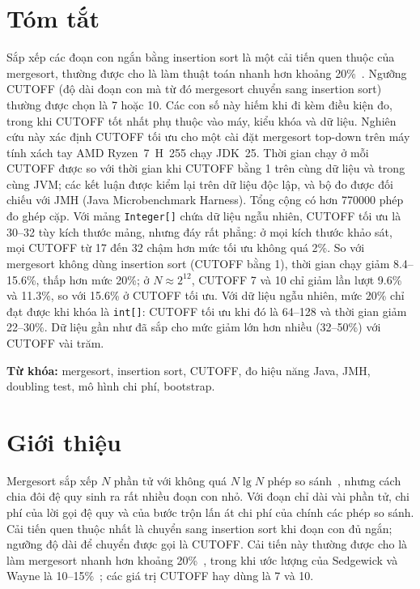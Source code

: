 \documentclass[12pt,a4paper]{article}
\begin{document}
\section*{Tóm tắt}\label{sec:abs}
Sắp xếp các đoạn con ngắn bằng insertion sort là một cải tiến quen thuộc của mergesort, thường được cho là làm thuật toán nhanh hơn khoảng 20\%~\citep{baigiang}. Ngưỡng CUTOFF (độ dài đoạn con mà từ đó mergesort chuyển sang insertion sort) thường được chọn là 7 hoặc 10. Các con số này hiếm khi đi kèm điều kiện đo, trong khi CUTOFF tốt nhất phụ thuộc vào máy, kiểu khóa và dữ liệu. Nghiên cứu này xác định CUTOFF tối ưu cho một cài đặt mergesort top-down trên máy tính xách tay AMD Ryzen~7~H~255 chạy JDK~25. Thời gian chạy ở mỗi CUTOFF được so với thời gian khi CUTOFF bằng 1 trên cùng dữ liệu và trong cùng JVM; các kết luận được kiểm lại trên dữ liệu độc lập, và bộ đo được đối chiếu với JMH (Java Microbenchmark Harness). Tổng cộng có hơn \num{770000} phép đo ghép cặp. Với mảng \texttt{Integer[]} chứa dữ liệu ngẫu nhiên, CUTOFF tối ưu là 30--32 tùy kích thước mảng, nhưng đáy rất phẳng: ở mọi kích thước khảo sát, mọi CUTOFF từ 17 đến 32 chậm hơn mức tối ưu không quá 2\%. So với mergesort không dùng insertion sort (CUTOFF bằng 1), thời gian chạy giảm 8.4--15.6\%, thấp hơn mức 20\%; ở $N \approx 2^{12}$, CUTOFF 7 và 10 chỉ giảm lần lượt 9.6\% và 11.3\%, so với 15.6\% ở CUTOFF tối ưu. Với dữ liệu ngẫu nhiên, mức 20\% chỉ đạt được khi khóa là \texttt{int[]}: CUTOFF tối ưu khi đó là 64--128 và thời gian giảm 22--30\%. Dữ liệu gần như đã sắp cho mức giảm lớn hơn nhiều (32--50\%) với CUTOFF vài trăm.

\medskip
\noindent\textbf{Từ khóa:} mergesort, insertion sort, CUTOFF, đo hiệu năng Java, JMH, doubling test, mô hình chi phí, bootstrap.

\clearpage
\tableofcontents
\clearpage
{}

\section{Giới thiệu}\label{sec:1}
Mergesort sắp xếp $N$ phần tử với không quá $N \lg N$ phép so sánh~\citep{sedgewick2011}, nhưng cách chia đôi đệ quy sinh ra rất nhiều đoạn con nhỏ. Với đoạn chỉ dài vài phần tử, chi phí của lời gọi đệ quy và của bước trộn lấn át chi phí của chính các phép so sánh. Cải tiến quen thuộc nhất là chuyển sang insertion sort khi đoạn con đủ ngắn; ngưỡng độ dài để chuyển được gọi là CUTOFF. Cải tiến này thường được cho là làm mergesort nhanh hơn khoảng 20\%~\citep{baigiang}, trong khi ước lượng của Sedgewick và Wayne là 10--15\%~\citep{algs4mergesort}; các giá trị CUTOFF hay dùng là 7 và 10.
\end{document}
